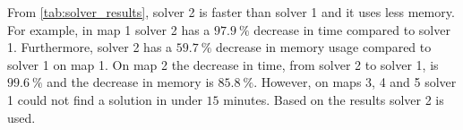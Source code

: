 \documentclass[../report.tex]{subfiles}
\begin{document}
From \autoref{tab:solver_results}, solver 2 is faster than solver 1 and it uses less memory. For example, in map 1 solver 2 has a $97.9\ \%$ decrease in time compared to solver 1. Furthermore, solver 2 has a $59.7\ \%$ decrease in memory usage compared to solver 1 on map 1. On map 2 the decrease in time, from solver 2 to solver 1, is $99.6\ \%$ and the decrease in memory is $85.8\ \%$. However, on maps 3, 4 and 5 solver 1 could not find a solution in under $15$ minutes. Based on the results solver 2 is used.
\end{document}
